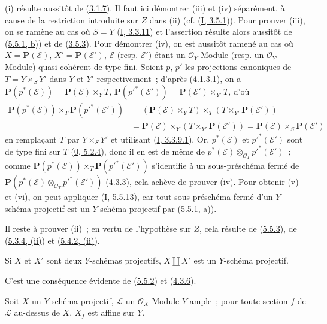 (i) résulte aussitôt de (\hyperref[II.3.1.7-fr]{3.1.7}). Il faut ici
démontrer (iii) et (iv) séparément, à cause de la restriction introduite sur
$Z$ dans (ii) (cf. (\hyperref[I.3.5.1-fr]{I, 3.5.1})). Pour prouver (iii), on
se ramène au cas où $S=Y$ (\hyperref[I.3.3.11-fr]{I, 3.3.11}) et l'assertion
résulte alors aussitôt de (\hyperref[II.5.5.1-fr]{5.5.1, b)}) et de
(\hyperref[II.3.5.3-fr]{3.5.3}). Pour démontrer (iv), on est aussitôt ramené
au cas où $X=\mathbf{P}(\mathcal{E})$, $X'=\mathbf{P}(\mathcal{E}')$,
$\mathcal{E}$ (resp. $\mathcal{E}'$) étant un $\mathcal{O}_Y$-Module (resp.
un $\mathcal{O}_{Y'}$-Module) quasi-cohérent de type fini. Soient $p$, $p'$ les
projections canoniques de $T=Y\times_SY'$ dans $Y$ et $Y'$ respectivement~;
d'après (\hyperref[II.4.1.3.1-fr]{4.1.3.1}), on a
$\mathbf{P}(p^*(\mathcal{E}))=\mathbf{P}(\mathcal{E})\times_YT$,
$\mathbf{P}(p'^*(\mathcal{E}'))=\mathbf{P}(\mathcal{E}')\times_{Y'}T$, d'où
\begin{align*}
\mathbf{P}(p^*(\mathcal{E}))\times_T\mathbf{P}(p'^*(\mathcal{E}'))
&=(\mathbf{P}(\mathcal{E})\times_YT)\times_T
(T\times_{Y'}\mathbf{P}(\mathcal{E}'))\\
&=\mathbf{P}(\mathcal{E})\times_Y
(T\times_{Y'}\mathbf{P}(\mathcal{E}'))
=\mathbf{P}(\mathcal{E})\times_S\mathbf{P}(\mathcal{E}')
\end{align*}
en remplaçant $T$ par $Y\times_SY'$ et utilisant
(\hyperref[I.3.3.9.1-fr]{I, 3.3.9.1}). Or, $p^*(\mathcal{E})$ et
$p'^*(\mathcal{E}')$ sont de type fini sur $T$
(\hyperref[0.5.2.4-fr]{0, 5.2.4}), donc il en est de même de
$p^*(\mathcal{E})\otimes_{\mathcal{O}_T}p'^*(\mathcal{E}')$~; comme
$\mathbf{P}(p^*(\mathcal{E}))\times_T\mathbf{P}(p'^*(\mathcal{E}'))$
s'identifie à un sous-préschéma fermé de
$\mathbf{P}(p^*(\mathcal{E})\otimes_{\mathcal{O}_T}p'^*(\mathcal{E}'))$
(\hyperref[II.4.3.3-fr]{4.3.3}), cela achève de prouver (iv). Pour obtenir (v)
et (vi), on peut appliquer (\hyperref[I.5.5.13-fr]{I, 5.5.13}), car tout
sous-préschéma fermé d'un $Y$-schéma projectif est un $Y$-schéma projectif par
(\hyperref[II.5.5.1-fr]{5.5.1, a)}).

Il reste à prouver (ii)~; en vertu de l'hypothèse sur $Z$, cela résulte de
(\hyperref[II.5.5.3-fr]{5.5.3}), de
(\hyperref[II.5.3.4-fr]{5.3.4, (ii)}) et
(\hyperref[II.5.4.2-fr]{5.4.2, (ii)}).

\begin{proposition}[5.5.6]
\label{II.5.5.6-fr}
Si $X$ et $X'$ sont deux $Y$-schémas projectifs, $X\amalg X'$ est un
$Y$-schéma projectif.
\end{proposition}

C'est une conséquence évidente de (\hyperref[II.5.5.2-fr]{5.5.2}) et
(\hyperref[II.4.3.6-fr]{4.3.6}).

\begin{proposition}[5.5.7]
\label{II.5.5.7-fr}
Soit $X$ un $Y$-schéma projectif, $\mathcal{L}$ un $\mathcal{O}_X$-Module
$Y$-ample~; pour toute section $f$ de $\mathcal{L}$ au-dessus de $X$, $X_f$
est affine sur $Y$.
\end{proposition}


